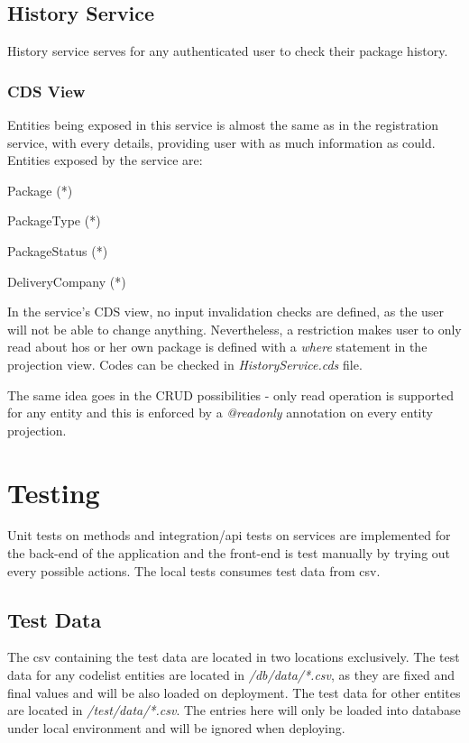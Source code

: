 \subsection{History Service}
History service serves for any authenticated user to check their package history.

\subsubsection{CDS View}

Entities being exposed in this service is almost the same as in the registration service, with every details, providing user with as much information as could. Entities exposed by the service are:
\begin{compactenum}
	\item Package (*)
    \item PackageType (*)
    \item PackageStatus (*)
    \item DeliveryCompany (*)
\end{compactenum}

\bigskip
In the service's CDS view, no input invalidation checks are defined, as the user will not be able to change anything. Nevertheless, a restriction makes user to only read about hos or her own package is defined with a \textit{where} statement in the projection view. Codes can be checked in \textit{HistoryService.cds} file.

\bigskip
The same idea goes in the CRUD possibilities - only read operation is supported for any entity and this is enforced by a \textit{@readonly} annotation on every entity projection.


\section{Testing}
\label{sec:D-testing}

Unit tests on methods and integration/api tests on services are implemented for the back-end of the application and the front-end is test manually by trying out every possible actions. The local tests consumes test data from csv. 

\subsection{Test Data}
The csv containing the test data are located in two locations exclusively. The test data for any codelist entities are located in \textit{/db/data/*.csv}, as they are fixed and final values and will be also loaded on deployment. The test data for other entites are located in \textit{/test/data/*.csv}. The entries here will only be loaded into database under local environment and will be ignored when deploying.

